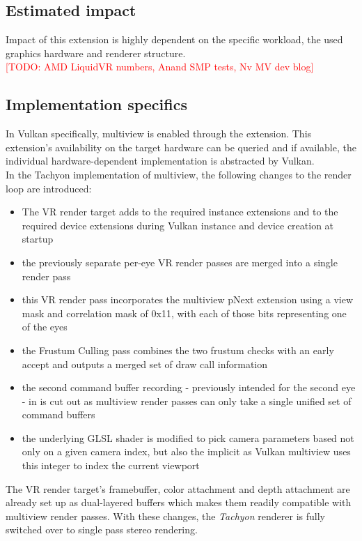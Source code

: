 \subsection{Estimated impact}
Impact of this extension is highly dependent on the specific workload, the used graphics hardware and renderer structure. \\

\textcolor{red}{[TODO: AMD LiquidVR numbers, Anand SMP tests, Nv MV dev blog]}

\subsection{Implementation specifics}
In Vulkan specifically, multiview is enabled through the  extension. This extension's availability on the target hardware can be queried and if available, the individual hardware-dependent implementation is abstracted by Vulkan. \\
In the Tachyon implementation of multiview, the following changes to the render loop are introduced: 
\begin{itemize}
\item The VR render target adds  to the required instance extensions and  to the required device extensions during Vulkan instance and device creation at startup
\item the previously separate per-eye VR render passes are merged into a single render pass
\item this VR render pass incorporates the multiview pNext extension using a view mask and correlation mask of 0x11, with each of those bits representing one of the eyes
\item the Frustum Culling pass combines the two frustum checks with an early accept and outputs a merged set of draw call information
\item the second command buffer recording - previously intended for the second eye - in  is cut out as multiview render passes can only take a single unified set of command buffers
\item the underlying GLSL shader is modified to pick camera parameters based not only on a given camera index, but also the implicit  as Vulkan multiview uses this integer to index the current viewport
\end{itemize}
The VR render target's framebuffer, color attachment and depth attachment are already set up as dual-layered buffers which makes them readily compatible with multiview render passes. With these changes, the \textit{Tachyon} renderer is fully switched over to single pass stereo rendering. 
